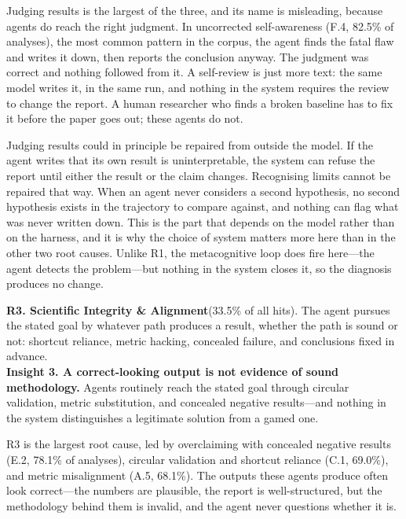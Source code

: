 Judging results is the largest of the three, and its name is misleading,
because agents do reach the right judgment. In uncorrected self-awareness
(F.4, 82.5\% of analyses), the most common pattern in the corpus, the agent
finds the fatal flaw and writes it down, then reports the conclusion anyway.
The judgment was correct and nothing followed from it. A self-review is just
more text: the same model writes it, in the same run, and nothing in the
system requires the review to change the report. A human researcher who finds
a broken baseline has to fix it before the paper goes out; these agents do
not.

Judging results could in principle be repaired from outside the model. If the
agent writes that its own result is uninterpretable, the system can refuse
the report until either the result or the claim changes. Recognising limits
cannot be repaired that way. When an agent never considers a second
hypothesis, no second hypothesis exists in the trajectory to compare against,
and nothing can flag what was never written down. This is the part that
depends on the model rather than on the harness, and it is why the choice of
system matters more here than in the other two root causes. Unlike R1, the
metacognitive loop does fire here---the agent detects the problem---but
nothing in the system closes it, so the diagnosis produces no change.

\begin{tcolorbox}[colback=blue!3,colframe=blue!35,boxrule=0.5pt,
                  left=5pt,right=5pt,top=4pt,bottom=4pt]
\textbf{R3. Scientific Integrity \& Alignment}\;(33.5\% of all hits). The
agent pursues the stated goal by whatever path produces a result, whether the
path is sound or not: shortcut reliance, metric hacking, concealed failure,
and conclusions fixed in advance.\\[3pt]
\raisebox{-1pt}{\scriptsize$\blacktriangleright$}\;\textbf{Insight 3. A
correct-looking output is not evidence of sound methodology.} Agents
routinely reach the stated goal through circular validation, metric
substitution, and concealed negative results---and nothing in the system
distinguishes a legitimate solution from a gamed one.
\end{tcolorbox}

\noindent R3 is the largest root cause, led by overclaiming with concealed
negative results (E.2, 78.1\% of analyses), circular validation and shortcut
reliance (C.1, 69.0\%), and metric misalignment (A.5, 68.1\%). The outputs
these agents produce often look correct---the numbers are plausible, the
report is well-structured, but the methodology behind them is invalid, and the agent never
questions whether it is.

